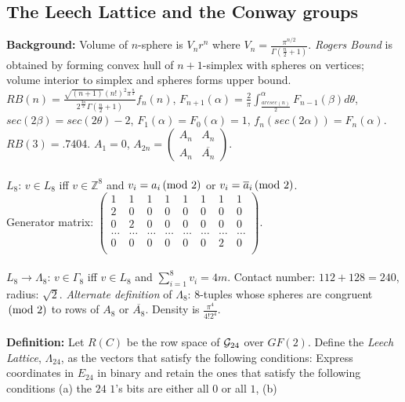 \subsection{The Leech Lattice and the Conway groups}
{\bf Background:} 
Volume of $n$-sphere is $V_n r^n$ where $V_n= {\frac {\pi^{n/2}} {\Gamma({\frac n 2}+1)}}$.
\emph{Rogers Bound} is obtained by forming convex hull of $n+1$-simplex with spheres on
vertices; volume interior to simplex and spheres forms upper bound.
$RB(n)=
{\frac {{\sqrt {(n+1)}} (n!)^2 \pi^{\frac n 2}} {2^{\frac {3n} {2}} \Gamma({\frac n 2}+1)}}
f_n(n)$,
$F_{n+1}(\alpha) = 
{\frac 2 {\pi}} \int^{\alpha}_{\frac {arcsec(n)} 2} F_{n-1}(\beta) d \theta$,
$sec(2 \beta) = sec( 2 \theta ) - 2$, $F_1(\alpha) = F_0 ( \alpha ) = 1$, 
$f_n (sec (2 \alpha))=
F_n(\alpha)$.  $RB(3)= .7404$.  $A_1 = 0$, $A_{2n}=
\left( \begin{array}{cc}
A_n & A_n \\
A_n & {\overline {A_n}}
\end{array}
\right)$.
\\
\\
$L_8$:  $v \in L_8$ iff $v \in {\mathbb Z}^8$ and $v_i = a_i \thinspace \textnormal{(mod } 2 \textnormal{)}$ or
$v_i = {\overline a_i} \thinspace \textnormal{(mod } 2 \textnormal{)}$.\\
Generator matrix:
$\left(
\begin{array}{cccccccc}
1 & 1 & 1 & 1 & 1 & 1 & 1 & 1 \\
2 & 0 & 0 & 0 & 0 & 0 & 0 & 0 \\
0 & 2 & 0 & 0 & 0 & 0 & 0 & 0 \\
\ldots & \ldots & \ldots & \ldots & \ldots & \ldots & \ldots & \ldots \\
0 & 0 & 0 & 0 & 0 & 0 & 2 & 0 \\
\end{array}
\right)$.
\\
\\
$L_8 \rightarrow \Lambda_8$:  $v \in \Gamma_8$ iff
$v \in L_8$ and $\sum_{i=1}^{8} v_i = 4m$.  Contact number: $112+128=240$, radius: ${\sqrt 2}$.
\emph{Alternate definition} of $\Lambda_8$: $8$-tuples whose spheres are congruent $\thinspace \textnormal{(mod } 2 \textnormal{)}$ to
rows of $A_8$ or ${\overline {A_8}}$.
Density is ${\frac {\pi^4}{4!2^4}}$.
\\
\\
{\bf Definition:}
Let $R(C)$ be the row space of ${\cal G}_{24}$ over $GF(2)$.  
Define the \emph{Leech Lattice}, $\Lambda_{24}$,
as the vectors that satisfy the following conditions:
Express coordinates in $E_{24}$ in binary and retain the ones that satisfy
the following conditions (a) the $24$ $1$'s bits are either all $0$ or all $1$, (b)
